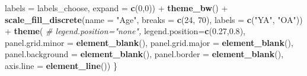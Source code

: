 \documentclass[11pt,,]{article}
\newenvironment{Shaded}{\begin{snugshade}}{\end{snugshade}}
\newcommand{\KeywordTok}[1]{\textcolor[rgb]{0.13,0.29,0.53}{\textbf{{#1}}}}
\newcommand{\DataTypeTok}[1]{\textcolor[rgb]{0.13,0.29,0.53}{{#1}}}
\newcommand{\DecValTok}[1]{\textcolor[rgb]{0.00,0.00,0.81}{{#1}}}
\newcommand{\FloatTok}[1]{\textcolor[rgb]{0.00,0.00,0.81}{{#1}}}
\newcommand{\StringTok}[1]{\textcolor[rgb]{0.31,0.60,0.02}{{#1}}}
\newcommand{\CommentTok}[1]{\textcolor[rgb]{0.56,0.35,0.01}{\textit{{#1}}}}
\newcommand{\NormalTok}[1]{{#1}}
\begin{document}
\begin{Shaded}
\begin{Highlighting}[]
        \DataTypeTok{labels =} \NormalTok{labels_choose,}
        \DataTypeTok{expand =} \KeywordTok{c}\NormalTok{(}\DecValTok{0}\NormalTok{,}\DecValTok{0}\NormalTok{)) +}
\StringTok{      }\KeywordTok{theme_bw}\NormalTok{() +}\StringTok{ }
\StringTok{      }\KeywordTok{scale_fill_discrete}\NormalTok{(}\DataTypeTok{name =} \StringTok{"Age"}\NormalTok{, }\DataTypeTok{breaks =} \KeywordTok{c}\NormalTok{(}\DecValTok{24}\NormalTok{, }\DecValTok{70}\NormalTok{), }\DataTypeTok{labels =} \KeywordTok{c}\NormalTok{(}\StringTok{"YA"}\NormalTok{, }\StringTok{"OA"}\NormalTok{)) +}
\StringTok{      }\KeywordTok{theme}\NormalTok{(}
        \CommentTok{# legend.position="none",}
        \DataTypeTok{legend.position=}\KeywordTok{c}\NormalTok{(}\FloatTok{0.27}\NormalTok{,}\FloatTok{0.8}\NormalTok{),}
      \DataTypeTok{panel.grid.minor =} \KeywordTok{element_blank}\NormalTok{(), }
        \DataTypeTok{panel.grid.major =} \KeywordTok{element_blank}\NormalTok{(), }
        \DataTypeTok{panel.background =} \KeywordTok{element_blank}\NormalTok{(),}
      \DataTypeTok{panel.border =} \KeywordTok{element_blank}\NormalTok{(), }
        \DataTypeTok{axis.line =} \KeywordTok{element_line}\NormalTok{())}
\NormalTok{\}}
\end{Highlighting}
\end{Shaded}

\newpage
\end{document}
